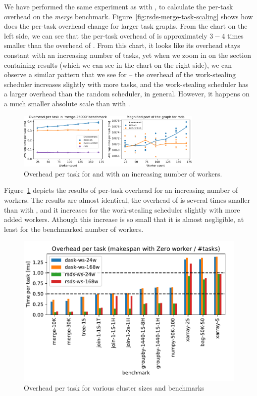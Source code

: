 We have performed the same experiment as with \dask{}, to calculate the
per-task overhead on the \emph{merge} benchmark. Figure~\ref{fig:rsds-merge-task-scaling}
shows how does the per-task overhead change for larger task graphs. From the chart on the left
side, we can see that the per-task overhead of \rsds{} is approximately
$3-4$ times smaller than the overhead of \dask{}. From
this chart, it looks like its overhead stays constant with an increasing number of tasks, yet when
we zoom in on the section containing \rsds{} results (which we can see in the
chart on the right side), we can observe a similar pattern that we see for
\dask{} -- the overhead of the work-stealing scheduler increases slightly with
more tasks, and the work-stealing scheduler has a larger overhead than the random scheduler, in
general. However, it happens on a much smaller absolute scale than with
\dask{}.

\begin{figure}
	\centering
	\includegraphics[width=0.8\textwidth]{./imgs/rsds/charts/rsds-merge-worker-scaling}
	\caption{Overhead per task for \rsds{} and \dask{} with an increasing
	number of workers.}
	\label{fig:rsds-merge-worker-scaling}
\end{figure}

Figure~\ref{fig:rsds-merge-worker-scaling} depicts the results of per-task overhead for an increasing
number of workers. The results are almost identical, the overhead of \rsds{} is
several times smaller than with \dask{}, and it increases for the work-stealing
scheduler slightly with more added workers. Athough this increase is so small that it is almost
negligible, at least for the benchmarked number of workers.

\begin{figure}
	\centering
	\includegraphics[width=0.8\columnwidth]{./imgs/rsds/charts/rsds-dask-overhead-all}
	\caption{Overhead per task for various cluster sizes and benchmarks}
	\label{fig:rsds-dask-overhead-all}
\end{figure}

